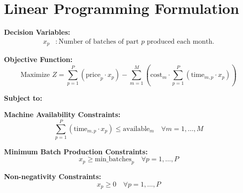 \documentclass{article}
\begin{document}
\section*{Linear Programming Formulation}

\textbf{Decision Variables:}
\begin{align*}
x_p &: \text{Number of batches of part } p \text{ produced each month.}
\end{align*}

\textbf{Objective Function:}
\[
\text{Maximize } Z = \sum_{p=1}^{P} \left( \text{price}_p \cdot x_p \right) - \sum_{m=1}^{M} \left( \text{cost}_m \cdot \sum_{p=1}^{P} \left( \text{time}_{m,p} \cdot x_p \right) \right)
\]

\textbf{Subject to:}

\textbf{Machine Availability Constraints:}
\[
\sum_{p=1}^{P} \left( \text{time}_{m,p} \cdot x_p \right) \leq \text{available}_m \quad \forall m = 1, \ldots, M
\]

\textbf{Minimum Batch Production Constraints:}
\[
x_p \geq \text{min_batches}_p \quad \forall p = 1, \ldots, P
\]

\textbf{Non-negativity Constraints:}
\[
x_p \geq 0 \quad \forall p = 1, \ldots, P
\]
\end{document}

